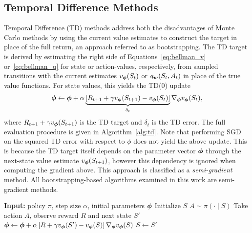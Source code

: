   \subsection{Temporal Difference Methods} \label{subsec:td}
  Temporal Difference (TD) methods address both the disadvantages of Monte Carlo methods by using the current value estimates to construct the target in place of the full return, an approach referred to as bootstrapping. The TD target is derived by estimating the right side of Equations~\eqref{eq:bellman_v} or~\eqref{eq:bellman_q} for state or action-values, respectively, from sampled transitions with the current estimates $v_{\bm \phi}(S_t)$ or $q_{\bm w}(S_t, A_t)$ in place of the true value functions. For state values, this yields the TD(0) update
  \begin{equation}
      {\bm \phi} \gets {\bm \phi} + \alpha \underbrace{\left[ R_{t+1} + \gamma v_{\bm \phi}(S_{t+1}) - v_{\bm \phi}(S_t) \right]}_{\delta_t} \nabla_{{\bm \phi}} v_{\bm \phi}(S_t),
      \label{eq:td_update}
  \end{equation}
  where $R_{t+1} + \gamma v_{\bm \phi}(S_{t+1})$ is the TD target and $\delta_t$ is the TD error. The full evaluation procedure is given in Algorithm~\ref{alg:td}. Note that performing SGD on the squared TD error with respect to $\phi$ does not yield the above update. This is because the TD target itself depends on the parameter vector ${\bm \phi}$ through the next-state value estimate $v_{\bm \phi}(S_{t+1})$, however this dependency is ignored when computing the gradient above. This approach is classified as a \textit{semi-gradient} method. All bootstrapping-based algorithms examined in this work are semi-gradient methods.
  
  \begin{algorithm}[t]
  \caption{TD(0) Policy Evaluation}
  \label{alg:td}
  \begin{algorithmic}[1]
  \State \textbf{Input:} policy $\pi$, step size $\alpha$, initial parameters ${\bm \phi}$
      \State Initialize $S$
          \State $A \sim \pi(\cdot \mid S)$
          \State Take action $A$, observe reward $R$ and next state $S'$
          \State ${\bm \phi} \gets {\bm \phi} + \alpha \left[ R + \gamma v_{\bm \phi}(S') - v_{\bm \phi}(S) \right] \nabla_{{\bm \phi}} v_{\bm \phi}(S)$ 
          \State $S \gets S'$
      \EndWhile
  \EndFor
  \end{algorithmic}
  \end{algorithm}
  
